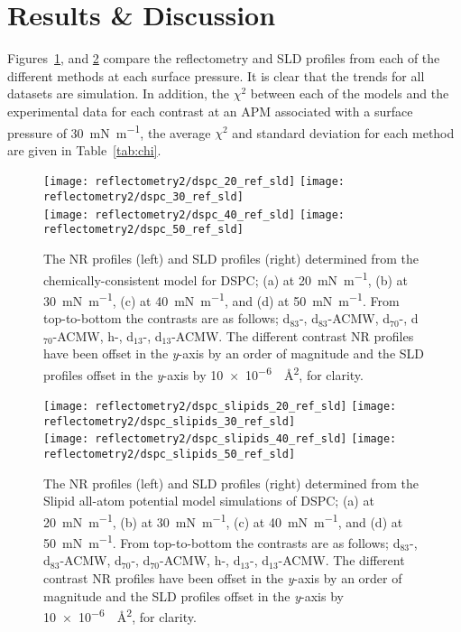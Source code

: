 \section{Results \& Discussion}
Figures~\ref{fig:dspcccref}, and \ref{fig:dspcmartref} compare the reflectometry and SLD profiles from each of the different methods at each surface pressure.
It is clear that the trends for all datasets are simulation.
In addition, the $\chi^2$ between each of the models and the experimental data for each contrast at an APM associated with a surface pressure of \SI{30}{\milli\newton\per\meter}, the average $\chi^2$ and standard deviation for each method are given in Table~\ref{tab:chi}.
%
\begin{figure}
    \centering
    \texttt{[image: reflectometry2/dspc\_20\_ref\_sld]}
    \texttt{[image: reflectometry2/dspc\_30\_ref\_sld]}\\
    \texttt{[image: reflectometry2/dspc\_40\_ref\_sld]}
    \texttt{[image: reflectometry2/dspc\_50\_ref\_sld]}
    \caption{The NR profiles (left) and SLD profiles (right) determined from the chemically-consistent model for DSPC; (a) at \SI{20}{\milli\newton\per\meter}, (b) at \SI{30}{\milli\newton\per\meter}, (c) at \SI{40}{\milli\newton\per\meter}, and (d) at \SI{50}{\milli\newton\per\meter}. From top-to-bottom the contrasts are as follows; d${_83}$-, d${_83}$-ACMW, d${_70}$-, d${_70}$-ACMW, h-, d${_13}$-, d${_13}$-ACMW. The different contrast NR profiles have been offset in the \emph{y}-axis by an order of magnitude and the SLD profiles offset in the \emph{y}-axis by \SI{10e-6}{\per\angstrom\squared}, for clarity.}
    \label{fig:dspcccref}
\end{figure}
%
%
\begin{figure}
    \centering
    \texttt{[image: reflectometry2/dspc\_slipids\_20\_ref\_sld]}
    \texttt{[image: reflectometry2/dspc\_slipids\_30\_ref\_sld]}\\
    \texttt{[image: reflectometry2/dspc\_slipids\_40\_ref\_sld]}
    \texttt{[image: reflectometry2/dspc\_slipids\_50\_ref\_sld]}
    \caption{The NR profiles (left) and SLD profiles (right) determined from the Slipid all-atom potential model simulations of DSPC; (a) at \SI{20}{\milli\newton\per\meter}, (b) at \SI{30}{\milli\newton\per\meter}, (c) at \SI{40}{\milli\newton\per\meter}, and (d) at \SI{50}{\milli\newton\per\meter}. From top-to-bottom the contrasts are as follows; d${_83}$-, d${_83}$-ACMW, d${_70}$-, d${_70}$-ACMW, h-, d${_13}$-, d${_13}$-ACMW. The different contrast NR profiles have been offset in the \emph{y}-axis by an order of magnitude and the SLD profiles offset in the \emph{y}-axis by \SI{10e-6}{\per\angstrom\squared}, for clarity.}
    \label{fig:dspcmartref}
\end{figure}
